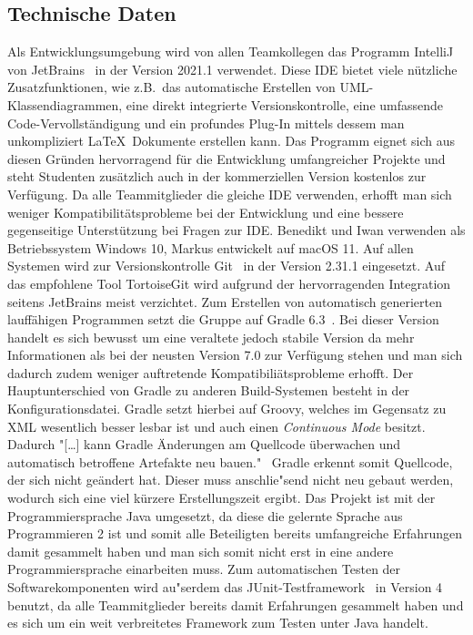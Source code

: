\newpage

\subsection{Technische Daten}\label{subsec:technische-daten}
Als Entwicklungsumgebung wird von allen Teamkollegen das Programm IntelliJ von JetBrains~\cite{intellij} in der Version 2021.1 verwendet.
Diese IDE bietet viele n\"utzliche Zusatzfunktionen, wie z.B.\ das automatische Erstellen von UML-Klassendiagrammen, eine direkt integrierte Versionskontrolle, eine umfassende Code-Vervollst\"andigung und ein profundes Plug-In mittels dessem man unkompliziert \LaTeX\ Dokumente erstellen kann.
Das Programm eignet sich aus diesen Gr\"unden hervorragend f\"ur die Entwicklung umfangreicher Projekte und steht Studenten zus\"atzlich auch in der kommerziellen Version kostenlos zur Verf\"ugung.
Da alle Teammitglieder die gleiche IDE verwenden, erhofft man sich weniger Kompatibilit\"atsprobleme bei der Entwicklung und eine bessere gegenseitige Unterst\"utzung bei Fragen zur IDE.
Benedikt und Iwan verwenden als Betriebssystem Windows 10, Markus entwickelt auf macOS 11.
Auf allen Systemen wird zur Versionskontrolle Git~\cite{git} in der Version 2.31.1 eingesetzt.
Auf das empfohlene Tool TortoiseGit wird aufgrund der hervorragenden Integration seitens JetBrains meist verzichtet.
Zum Erstellen von automatisch generierten lauff\"ahigen Programmen setzt die Gruppe auf Gradle 6.3~\cite{gradle}.
Bei dieser Version handelt es sich bewusst um eine veraltete jedoch stabile Version da mehr Informationen als bei der neusten Version 7.0 zur Verf\"ugung stehen und man sich dadurch zudem weniger auftretende Kompatibili\"atsprobleme erhofft.
Der Hauptunterschied von Gradle zu anderen Build-Systemen besteht in der Konfigurationsdatei.
Gradle setzt hierbei auf Groovy, welches im Gegensatz zu XML wesentlich besser lesbar ist und auch einen \emph{Continuous Mode} besitzt.
Dadurch "[\ldots] kann Gradle \"Anderungen am Quellcode \"uberwachen und automatisch betroffene Artefakte neu bauen." \cite[S. 219 ff.]{besserCoden:gradle}
\ Gradle erkennt somit Quellcode, der sich nicht ge\"andert hat.
Dieser muss anschlie"send nicht neu gebaut werden, wodurch sich eine viel k\"urzere Erstellungszeit ergibt.
Das Projekt ist mit der Programmiersprache Java umgesetzt, da diese die gelernte Sprache aus Programmieren 2 ist und somit alle Beteiligten bereits umfangreiche Erfahrungen damit gesammelt haben und man sich somit nicht erst in eine andere Programmiersprache einarbeiten muss.
Zum automatischen Testen der Softwarekomponenten wird au"serdem das JUnit-Testframework~\cite{junit} in Version 4 benutzt, da alle Teammitglieder bereits damit Erfahrungen gesammelt haben und es sich um ein weit verbreitetes Framework zum Testen unter Java handelt.

